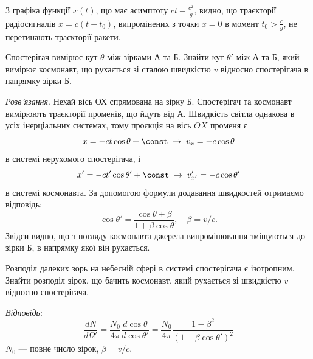 \begin{problem}
\begin{center}
\end{center}

З графіка функції $x(t)$, що має асимптоту $ct - \frac{c^{2}}{g}$, видно, що траєкторії радіосигналів $x = c(t -
t_{0})$, випромінених з точки $x = 0$ в момент $t_{0} > \frac{c}{g}$, не перетинають траєкторії ракети.
\end{problem}

\begin{problem}\label{prb:far_stars} Спостерігач вимірює кут $\theta$ між зірками А та Б. Знайти кут $\theta'$ між А та
Б, який вимірює космонавт, що рухається зі сталою швидкістю $v$ відносно спостерігача в напрямку зірки Б.

\emph{Розв'язання}. Нехай вісь ОХ спрямована на зірку Б. Спостерігач та космонавт вимірюють траєкторії променів, що
йдуть від А. Швидкість світла однакова в усіх інерціальних системах, тому проєкція на вісь $OX$ променя є
\[
x = - ct\cos\theta + \const \;\rightarrow\; v_{x} = - c\cos\theta
\]
в системі нерухомого спостерігача, і
\[
x' = - ct'\cos\theta' + \const \;\rightarrow\; v'_{x'} = - c\cos\theta'
\]
в системі космонавта. За допомогою формули додавання швидкостей отримаємо відповідь:
\[
\cos\theta' = \frac{\cos\theta + \beta}{1 + \beta\cos\theta},\quad \beta = v/c.
\]
Звідси видно, що з погляду космонавта джерела випромінювання зміщуються до зірки Б, в напрямку якої він рухається.
\end{problem}

\begin{problem}
Розподіл далеких зорь на небесній сфері в системі спостерігача є ізотропним. Знайти розподіл зірок, що бачить космонавт,
який рухається зі швидкістю $v$ відносно спостерігача.

\emph{Відповідь}:
\[
\frac{dN}{d\Omega'} = \frac{N_{0}}{4\pi}\frac{d\cos\theta}{d\cos\theta'}
= \frac{N_{0}}{4\pi}\frac{1 - \beta^{2}}{(1 - \beta\cos\theta')^{2}}
\]
$N_{0}$ --- повне число зірок, $\beta = v/c$.
\end{problem}

